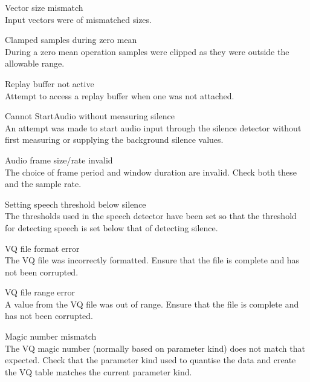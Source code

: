 \begin{itemize}
\begin{itemize}
    Vector size mismatch\\
        Input vectors were of mismatched sizes.

    Clamped samples during zero mean\\
        During a zero mean operation samples were clipped as they were outside
        the allowable range.

\end{itemize}


\begin{itemize}
    Replay buffer not active\\
        Attempt to access a replay buffer when one was not attached.

    Cannot StartAudio without measuring silence\\
        An attempt was made to start audio input through the silence detector 
        without first measuring or supplying the background silence values.

    Audio frame size/rate invalid\\
        The choice of frame period and window duration are invalid.  Check
        both these and the sample rate.

    Setting speech threshold below silence\\
        The thresholds used in the speech detector have been set so that the
        threshold for detecting speech is set below that of detecting silence.

\end{itemize}


\begin{itemize}
    VQ file format error\\
        The VQ file was incorrectly formatted.  Ensure that the file is 
        complete and has not been corrupted.

    VQ file range error\\
        A value from the VQ file was out of range.  Ensure that the file is 
        complete and has not been corrupted.

    Magic number mismatch\\
        The VQ magic number (normally based on parameter kind) does not match
        that expected.  Check that the parameter kind used to quantise the data
        and create the VQ table matches the current parameter kind.


\end{itemize}
\end{itemize}
